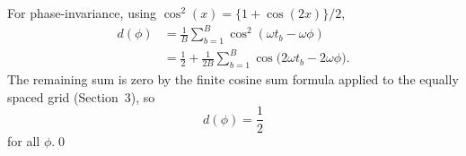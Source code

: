 \documentclass[11pt]{article}
\begin{document}
For phase-invariance, using $\cos^2(x)=\{1+\cos(2x)\}/2$,
\begin{align*}
d(\phi)
&=
\frac{1}{B}\sum_{b=1}^B \cos^2(\omega t_b-\omega\phi)\\
&=
\frac{1}{2}
+
\frac{1}{2B}\sum_{b=1}^B \cos\!\bigl(2\omega t_b-2\omega\phi\bigr).
\end{align*}
The remaining sum is zero by the finite cosine sum formula applied to the
equally spaced grid (Section~3), so
\[
d(\phi)=\frac{1}{2}
\]
for all $\phi$.\qed
\end{document}
